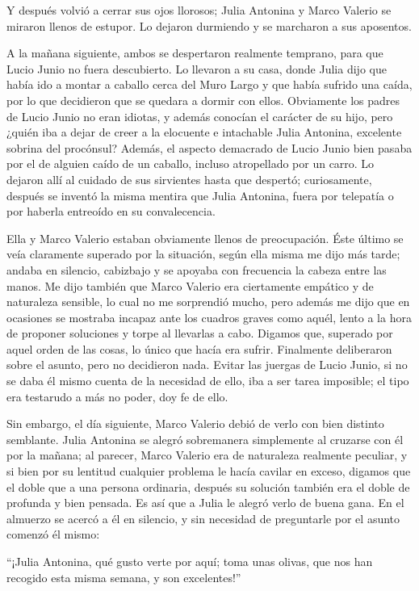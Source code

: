 \documentclass[11pt,openany]{book}
\begin{document}
Y después volvió a cerrar sus ojos llorosos; Julia Antonina y Marco Valerio se miraron llenos de estupor. Lo dejaron durmiendo y se marcharon a sus aposentos. 

A la mañana siguiente, ambos se despertaron realmente temprano, para que Lucio Junio no fuera descubierto. Lo llevaron a su casa, donde Julia dijo que había ido a montar a caballo cerca del Muro Largo y que había sufrido una caída, por lo que decidieron que se quedara a dormir con ellos. Obviamente los padres de Lucio Junio no eran idiotas, y además conocían el carácter de su hijo, pero ¿quién iba a dejar de creer a la elocuente e intachable Julia Antonina, excelente sobrina del procónsul? Además, el aspecto demacrado de Lucio Junio bien pasaba por el de alguien caído de un caballo, incluso atropellado por un carro. Lo dejaron allí al cuidado de sus sirvientes hasta que despertó; curiosamente, después se inventó la misma mentira que Julia Antonina, fuera por telepatía o por haberla entreoído en su convalecencia. 

Ella y Marco Valerio estaban obviamente llenos de preocupación. Éste último se veía claramente superado por la situación, según ella misma me dijo más tarde; andaba en silencio, cabizbajo y se apoyaba con frecuencia la cabeza entre las manos. Me dijo también que Marco Valerio era ciertamente empático y de naturaleza sensible, lo cual no me sorprendió mucho, pero además me dijo que en ocasiones se mostraba incapaz ante los cuadros graves como aquél, lento a la hora de proponer soluciones y torpe al llevarlas a cabo. Digamos que, superado por aquel orden de las cosas, lo único que hacía era sufrir. Finalmente deliberaron sobre el asunto, pero no decidieron nada. Evitar las juergas de Lucio Junio, si no se daba él mismo cuenta de la necesidad de ello, iba a ser tarea imposible; el tipo era testarudo a más no poder, doy fe de ello. 

Sin embargo, el día siguiente, Marco Valerio debió de verlo con bien distinto semblante. Julia Antonina se alegró sobremanera simplemente al cruzarse con él por la mañana; al parecer, Marco Valerio era de naturaleza realmente peculiar, y si bien por su lentitud cualquier problema le hacía cavilar en exceso, digamos que el doble que a una persona ordinaria, después su solución también era el doble de profunda y bien pensada. Es así que a Julia le alegró verlo de buena gana. En el almuerzo se acercó a él en silencio, y sin necesidad de preguntarle por el asunto comenzó él mismo: 

“¡Julia Antonina, qué gusto verte por aquí; toma unas olivas, que nos han recogido esta misma semana, y son excelentes!” 
\end{document}
